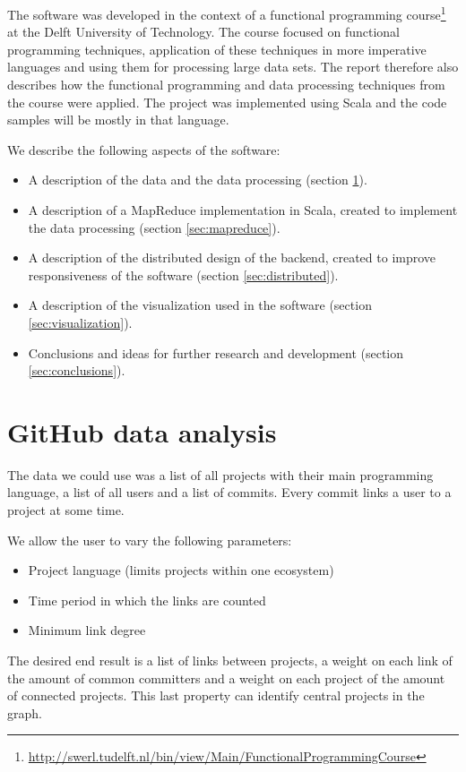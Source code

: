 \documentclass[10pt,a4paper]{article}
\begin{document}
The software was developed in the context of a functional programming course\footnote{\url{http://swerl.tudelft.nl/bin/view/Main/FunctionalProgrammingCourse}} at the Delft University of Technology. The course focused on functional programming techniques, application of these techniques in more imperative languages and using them for processing large data sets. The report therefore also describes how the functional programming and data processing techniques from the course were applied. The project was implemented using Scala and the code samples will be mostly in that language.

We describe the following aspects of the software:
\begin{itemize}
    \item A description of the data and the data processing (section \ref{sec:data}).
    \item A description of a MapReduce implementation in Scala, created to implement the data processing (section \ref{sec:mapreduce}).
    \item A description of the distributed design of the backend, created to improve responsiveness of the software (section \ref{sec:distributed}).
    \item A description of the visualization used in the software (section \ref{sec:visualization}).
    \item Conclusions and ideas for further research and development (section \ref{sec:conclusions}).
\end{itemize}

\section{GitHub data analysis}\label{sec:data}

The data we could use was a list of all projects with their main programming language, a list of all users and a list of commits. Every commit links a user to a project at some time.


We allow the user to vary the following parameters:
\begin{itemize}
    \item Project language (limits projects within one ecosystem)
    \item Time period in which the links are counted
    \item Minimum link degree
\end{itemize}
The desired end result is a list of links between projects, a weight on each link of the amount of common committers and a weight on each project of the amount of connected projects. This last property can identify central projects in the graph.
\end{document}
